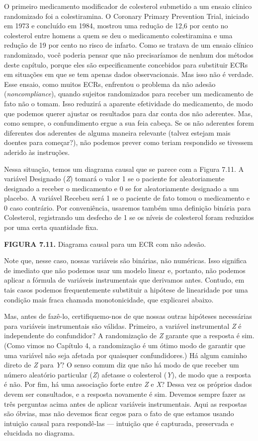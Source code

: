 \documentclass[11pt,a5paper,twoside]{book}
\begin{document}
O primeiro medicamento modificador de colesterol submetido a um ensaio clínico randomizado foi a colestiramina. O Coronary Primary Prevention Trial, iniciado em 1973 e concluído em 1984, mostrou uma redução de 12,6 por cento no colesterol entre homens a quem se deu o medicamento colestiramina e uma redução de 19 por cento no risco de infarto. Como se tratava de um ensaio clínico randomizado, você poderia pensar que não precisaríamos de nenhum dos métodos deste capítulo, porque eles são especificamente concebidos para substituir ECRs em situações em que se tem apenas dados observacionais. Mas isso não é verdade. Esse ensaio, como muitos ECRs, enfrentou o problema da não adesão (\textit{noncompliance}), quando sujeitos randomizados para receber um medicamento de fato não o tomam. Isso reduzirá a aparente efetividade do medicamento, de modo que podemos querer ajustar os resultados para dar conta dos não aderentes. Mas, como sempre, o confundimento ergue a sua feia cabeça. Se os não aderentes forem diferentes dos aderentes de alguma maneira relevante (talvez estejam mais doentes para começar?), não podemos prever como teriam respondido se tivessem aderido às instruções.

Nessa situação, temos um diagrama causal que se parece com a Figura 7.11. A variável Designado (\textit{Z}) tomará o valor 1 se o paciente for aleatoriamente designado a receber o medicamento e 0 se for aleatoriamente designado a um placebo. A variável Recebeu será 1 se o paciente de fato tomou o medicamento e 0 caso contrário. Por conveniência, usaremos também uma definição binária para Colesterol, registrando um desfecho de 1 se os níveis de colesterol foram reduzidos por uma certa quantidade fixa.

\textbf{FIGURA 7.11.} Diagrama causal para um ECR com não adesão.

Note que, nesse caso, nossas variáveis são binárias, não numéricas. Isso significa de imediato que não podemos usar um modelo linear e, portanto, não podemos aplicar a fórmula de variáveis instrumentais que derivamos antes. Contudo, em tais casos podemos frequentemente substituir a hipótese de linearidade por uma condição mais fraca chamada monotonicidade, que explicarei abaixo.

Mas, antes de fazê-lo, certifiquemo-nos de que nossas outras hipóteses necessárias para variáveis instrumentais são válidas. Primeiro, a variável instrumental \textit{Z} é independente do confundidor? A randomização de \textit{Z} garante que a resposta é sim. (Como vimos no Capítulo 4, a randomização é um ótimo modo de garantir que uma variável não seja afetada por quaisquer confundidores.) Há algum caminho direto de \textit{Z} para \textit{Y}? O senso comum diz que não há modo de que receber um número aleatório particular (\textit{Z}) afetasse o colesterol (\textit{Y}), de modo que a resposta é não. Por fim, há uma associação forte entre \textit{Z} e \textit{X}? Dessa vez os próprios dados devem ser consultados, e a resposta novamente é sim. Devemos sempre fazer as três perguntas acima antes de aplicar variáveis instrumentais. Aqui as respostas são óbvias, mas não devemos ficar cegos para o fato de que estamos usando intuição causal para respondê-las — intuição que é capturada, preservada e elucidada no diagrama.
\end{document}
